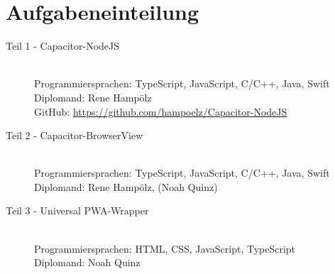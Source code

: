 \section{Aufgabeneinteilung}

\begin{description}
    \item[Teil 1 - Capacitor-NodeJS] \hfill \\
    Programmiersprachen: TypeScript, JavaScript, C/C++, Java, Swift \\
    Diplomand: Rene Hampölz \\
    GitHub: \href{https://github.com/hampoelz/Capacitor-NodeJS}{https://github.com/hampoelz/Capacitor-NodeJS}
    \item[Teil 2 - Capacitor-BrowserView] \hfill \\
    Programmiersprachen: TypeScript, JavaScript, C/C++, Java, Swift \\
    Diplomand: Rene Hampölz, (Noah Quinz)
    \item[Teil 3 - Universal PWA-Wrapper] \hfill \\
    Programmiersprachen: HTML, CSS, JavaScript, TypeScript \\
    Diplomand: Noah Quinz
\end{description}